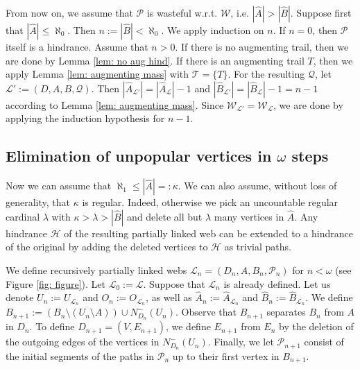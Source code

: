 \documentclass[12pt,a4paper]{amsart}
\theoremstyle{plain}
\theoremstyle{definition}
\begin{document}
From now on, we assume that $ \mathcal{P} $ is wasteful w.r.t. $ \mathcal{W} $, i.e. $ \left|\widehat{A}\right| 
>\left|\widehat{B}\right|$.  Suppose 
first that $ \left|\widehat{A}\right|\leq\aleph_0 $. Then $ n:=\left|\widehat{B}\right|<\aleph_0 $. We apply induction on $ n $. 
If $ n=0 $, then $ \mathcal{P} $ itself is a hindrance. Assume that $ n>0 $. If there is no augmenting trail, then we are done 
by Lemma \ref{lem: no aug hind}. If there is an augmenting trail $ T $, then we apply Lemma \ref{lem: augmenting mass} 
with $ \mathcal{T}=\{ T \} $. For the resulting $ \mathcal{Q} $, let $ \mathcal{L}':=(D,A,B, \mathcal{Q}) $. Then  $ 
\left|\widehat{A}_{\mathcal{L}'}\right|=\left|\widehat{A}_{\mathcal{L}}\right|-1 $ and $ 
\left|\widehat{B}_{\mathcal{L}'}\right|=\left|\widehat{B}_{\mathcal{L}}\right|-1=n-1 $ according to Lemma \ref{lem: 
augmenting mass}. Since $ \mathcal{W}_{\mathcal{L}'}=\mathcal{W}_{\mathcal{L}}  $, we are done by applying the 
induction 
hypothesis for $ n-1 $.


\subsection{Elimination of unpopular vertices in $ \omega $ steps}
Now we can assume that $  \aleph_1\leq \left|\widehat{A}\right|=:\kappa  $.  We can also assume, without loss of generality, 
that $ \kappa$ is regular. Indeed, otherwise we pick an uncountable regular cardinal $ \lambda $ with $ \kappa > \lambda 
>\left|\widehat{B}\right| $ and delete all but $ \lambda $ many vertices in $ \widehat{A} $. Any hindrance $ \mathcal{H} $ 
of the resulting partially linked web can be extended to a hindrance of the original by adding the deleted vertices to $ 
\mathcal{H} $ as trivial paths. 


We 
define recursively  partially linked webs $ \mathcal{L}_n=(D_n,A,B_n,\mathcal{P}_n) $ for  $ n<\omega $ (see Figure 
\ref{fig: figure}). Let 
 $ \mathcal{L}_0:=\mathcal{L} $.  Suppose  that $ 
\mathcal{L}_n $ is already 
defined. Let us denote $ U_n:=U_{\mathcal{L}_n} $ and $ O_n:=O_{\mathcal{L}_n} $, as well as $ 
\widehat{A}_n:=\widehat{A}_{\mathcal{L}_n} $ and $ 
\widehat{B}_n:=\widehat{B}_{\mathcal{L}_n} $. We define  $ 
B_{n+1}:=(B_n\setminus (U_n\setminus A))\cup 
N_{D_n}^{-}(U_n) $. Observe that $ B_{n+1} $ separates $ B_n $ from $ A $ in $ D_n $. To define $ 
D_{n+1}=(V,E_{n+1}) $, 
we define  $ E_{n+1} $  from $ E_n $ by the deletion 
of the outgoing edges of the vertices in $ N_{D_n}^{-}(U_n) $. Finally, we let $ \mathcal{P}_{n+1} $ consist of the 
initial segments of the paths in  $ \mathcal{P}_n $ up to their first vertex in $ B_{n+1} $. 
\end{document}
